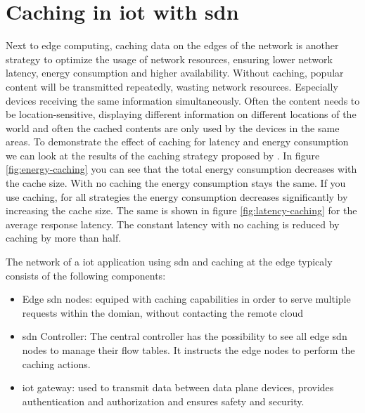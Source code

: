 \documentclass[conference]{IEEEtran}
\begin{document}
	






	\cite{8777339} \cite{Sahrish2017}

	\section{Caching in \ac{iot} with \ac{sdn}}
	\label{sec:caching}

	Next to edge computing, caching data on the edges of the network is another strategy to optimize the usage of network resources, ensuring lower network latency, energy consumption and higher availability. \cite{caching-1} \cite{caching-2} \cite{caching-4} Without caching, popular content will be transmitted repeatedly, wasting network resources. Especially devices receiving the same information simultaneously. Often the content needs to be location-sensitive, displaying different information on different locations of the world and often the cached contents are only used by the devices in the same areas. To demonstrate the effect of caching  for latency and energy consumption we can look at the results of the caching strategy proposed by \cite{caching-1}. In figure \ref{fig:energy-caching} you can see that the total energy consumption decreases with the cache size. With no caching the energy consumption stays the same. If you use caching, for all strategies the energy consumption decreases significantly by increasing the cache size. The same is shown in figure \ref{fig:latency-caching} for the average response latency. The constant latency with no caching is reduced by caching by more than half.

	The network of a \ac{iot} application using \ac{sdn} and caching at the edge typicaly consists of the following components:
	\begin{itemize}
		\item Edge \ac{sdn} nodes: equiped with caching capabilities in order to serve multiple requests within the domian, without contacting the remote cloud \cite{caching-1} \cite{caching-2}  
		\item \ac{sdn} Controller: The central controller has the possibility to see all edge \ac{sdn} nodes to manage their flow tables. It instructs the edge nodes to perform the caching actions. \cite{caching-1} \cite{caching-2}  
		\item \ac{iot} gateway: used to transmit data between data plane devices, provides authentication and authorization and ensures safety and security. \cite{caching-1}
	\end{itemize}
\end{document}
